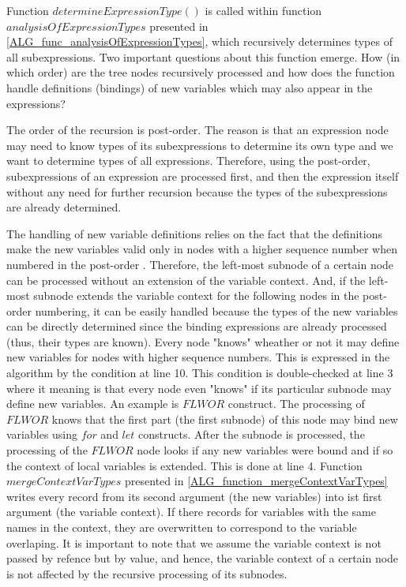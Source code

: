 Function $determineExpressionType()$ is called within function $analysisOfExpressionTypes$ presented in \ref{ALG_func_analysisOfExpressionTypes}, which recursively determines types of all subexpressions. Two important questions about this function emerge. How (in which order) are the tree nodes recursively processed and how does the function handle definitions (bindings) of new variables which may also appear in the expressions?

The order of the recursion is post-order. The reason is that an expression node may need to know types of its subexpressions to determine its own type and we want to determine types of all expressions. Therefore, using the post-order, subexpressions of an expression are processed first, and then the expression itself without any need for further recursion because the types of the subexpressions are already determined.

The handling of new variable definitions relies on the fact that the definitions make the new variables valid only in nodes with a higher sequence number when numbered in the post-order . Therefore, the left-most subnode of a certain node can be processed without an extension of the variable context. And, if the left-most subnode extends the variable context for the following nodes in the post-order numbering, it can be easily handled because the types of the new variables can be directly determined since the binding expressions are already processed (thus, their types are known). Every node "knows" wheather or not it may define new variables for nodes with higher sequence numbers. This is expressed in the algorithm by the condition at line 10. This condition is double-checked at line 3 where it meaning is that every node even "knows" if its particular subnode may define new variables. An example is $FLWOR$ construct. The processing of $FLWOR$ knows that the first part (the first subnode) of this node may bind new variables using $for$ and $let$ constructs. After the subnode is processed, the processing of the $FLWOR$ node looks if any new variables were bound and if so the context of local variables is extended. This is done at line 4. Function $mergeContextVarTypes$ presented in \ref{ALG_function_mergeContextVarTypes} writes every record from its second argument (the new variables) into ist first argument (the variable context). If there records for variables with the same names in the context, they are overwritten to correspond to the variable overlaping. It is important to note that we assume the variable context is not passed by refence but by value, and hence, the variable context of a certain node is not affected by the recursive processing of its subnodes.


